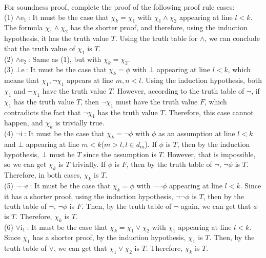 \documentclass{article}
\def\intro{\mathrm{i\ }}
\def\elim{\mathrm{e\ }}
\def\introa{\mathrm{i_1\ }}
\def\elima{\mathrm{e_1\ }}
\def\elimb{\mathrm{e_2\ }}
\def\andea{\land\elima}
\def\andeb{\land\elimb}
\def\oria{\lor\introa}
\def\negi{\neg\intro}
\begin{document}
\maketitle
\noindent For soundness proof, complete the proof of the following proof rule cases:
\\[1em]
(1) $\andea$: It must be the case that $\chi_k = \chi_1$ with $\chi_1 \land \chi_2$ appearing at line $l < k$. The formula $\chi_1 \land \chi_2$ has the shorter proof, and therefore, using the induction hypothesis, it has the truth value $T$. Using the truth table for $\land$, we can conclude that the truth value of $\chi_1$ is $T$.
\\[1em]
(2) $\andeb$: Same as (1), but with $\chi_k = \chi_2$.
\\[1em]
(3) $\bot\elim$: It must be the case that $\chi_k = \phi$ with $\bot$ appearing at line $l < k$, which means that $\chi_1, \neg\chi_1$ appears at line $m,n<l$. Using the induction hypothesis, both $\chi_1$ and $\neg\chi_1$ have the truth value $T$. However, according to the truth table of $\neg$, if $\chi_1$ has the truth value $T$, then $\neg\chi_1$ must have the truth value $F$, which contradicts the fact that $\neg\chi_1$ has the truth value $T$. Therefore, this case cannot happen, and $\chi_k$ is trivially true.
\\[1em]
(4) $\negi$: It must be the case that $\chi_k = \neg\phi$ with $\phi$ as an assumption at line $l < k$ and $\bot$ appearing at line $m < k$($m > l, l \in d_m$). If $\phi$ is $T$, then by the induction hypothesis, $\bot$ must be $T$ since the assumption is $T$. However, that is impossible, so we can get $\chi_k$ is $T$ trivially. If $\phi$ is $F$, then by the truth table of $\neg$, $\neg\phi$ is $T$. Therefore, in both cases, $\chi_k$ is $T$.
\\[1em]
(5) $\neg\neg\elim$: It must be the case that $\chi_k = \phi$ with $\neg\neg\phi$ appearing at line $l < k$. Since it has a shorter proof, using the induction hypothesis, $\neg\neg\phi$ is $T$, then by the truth table of $\neg$, $\neg\phi$ is $F$. Then, by the truth table of $\neg$ again, we can get that $\phi$ is $T$. Therefore, $\chi_k$ is $T$. 
\\[1em]
(6) $\oria$: It must be the case that $\chi_k = \chi_1 \lor \chi_2$ with $\chi_1$ appearing at line $l < k$. Since $\chi_1$ has a shorter proof, by the induction hypothesis, $\chi_1$ is $T$. Then, by the truth table of $\lor$, we can get that $\chi_1 \lor \chi_2$ is $T$. Therefore, $\chi_k$ is $T$.
\end{document}
